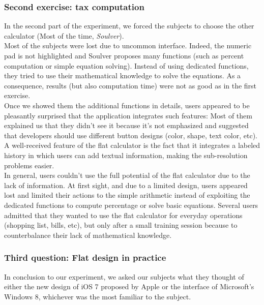 \documentclass[a4paper,11pt] {article}
\theoremstyle{definition}
\begin{document}
    \subsubsection{Second exercise: tax computation}

    In the second part of the experiment, we forced the subjects to choose the other calculator (Most of the time, \textit{Soulver}).\\

    Most of the subjects were lost due to uncommon interface. Indeed, the numeric pad is not highlighted and Soulver proposes many functions (such as percent computation or simple equation solving). Instead of using dedicated functions, they tried to use their mathematical knowledge to solve the equations. As a consequence, results (but also computation time) were not as good as in the first exercise.\\

    Once we showed them the additional functions in details, users appeared to be pleasantly surprised that the application integrates such features: Most of them explained us that they didn't see it because it's not emphasized and suggested that developers should use different button designs (color, shape, text color, etc). A well-received feature of the flat calculator is the fact that it integrates a labeled history in which users can add textual information, making the sub-resolution problems easier.\\

    In general, users couldn't use the full potential of the flat calculator due to the lack of information. At first sight, and due to a limited design, users appeared lost and limited their actions to the simple arithmetic instead of exploiting the dedicated functions to compute percentage or solve basic equations. Several users admitted that they wanted to use the flat calculator for everyday operations (shopping list, bills, etc), but only after a small training session because to counterbalance their lack of mathematical knowledge.\\

    \subsubsection{Third question: Flat design in practice}
    In conclusion to our experiment, we asked our subjects what they thought of either the new design of iOS 7 proposed by Apple or the interface of Microsoft's Windows 8, whichever was the most familiar to the subject.\\
\end{document}
